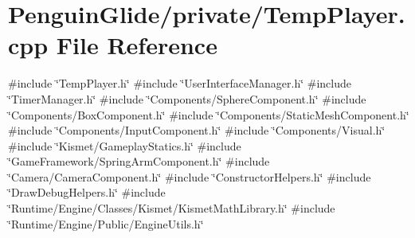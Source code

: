 \section{Penguin\+Glide/private/\+Temp\+Player.cpp File Reference}
\label{_temp_player_8cpp}
{\ttfamily \#include \char`\"{}Temp\+Player.\+h\char`\"{}}\newline
{\ttfamily \#include \char`\"{}User\+Interface\+Manager.\+h\char`\"{}}\newline
{\ttfamily \#include \char`\"{}Timer\+Manager.\+h\char`\"{}}\newline
{\ttfamily \#include \char`\"{}Components/\+Sphere\+Component.\+h\char`\"{}}\newline
{\ttfamily \#include \char`\"{}Components/\+Box\+Component.\+h\char`\"{}}\newline
{\ttfamily \#include \char`\"{}Components/\+Static\+Mesh\+Component.\+h\char`\"{}}\newline
{\ttfamily \#include \char`\"{}Components/\+Input\+Component.\+h\char`\"{}}\newline
{\ttfamily \#include \char`\"{}Components/\+Visual.\+h\char`\"{}}\newline
{\ttfamily \#include \char`\"{}Kismet/\+Gameplay\+Statics.\+h\char`\"{}}\newline
{\ttfamily \#include \char`\"{}Game\+Framework/\+Spring\+Arm\+Component.\+h\char`\"{}}\newline
{\ttfamily \#include \char`\"{}Camera/\+Camera\+Component.\+h\char`\"{}}\newline
{\ttfamily \#include \char`\"{}Constructor\+Helpers.\+h\char`\"{}}\newline
{\ttfamily \#include \char`\"{}Draw\+Debug\+Helpers.\+h\char`\"{}}\newline
{\ttfamily \#include \char`\"{}Runtime/\+Engine/\+Classes/\+Kismet/\+Kismet\+Math\+Library.\+h\char`\"{}}\newline
{\ttfamily \#include \char`\"{}Runtime/\+Engine/\+Public/\+Engine\+Utils.\+h\char`\"{}}\newline
